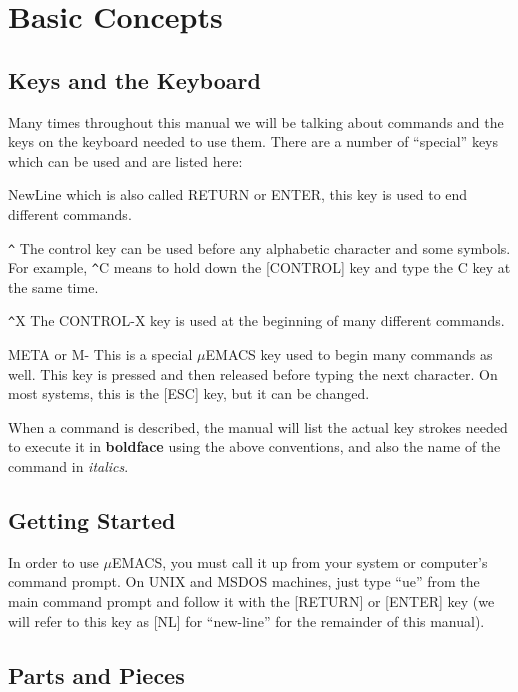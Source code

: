 \chapter{Basic Concepts}
\section{Keys and the Keyboard}

Many times throughout this manual we will be talking about commands and
the keys on the keyboard needed to use them. There are a number of
``special'' keys which can be used and are listed here:

{\sc [NL]} NewLine which is also called RETURN or ENTER, this key is used to
end different commands.

{\sc \verb+^+} The control key can be used before any alphabetic
character and some symbols. For example, \verb+^+C means to hold down the
[CONTROL] key and type the C key at the same time.

{\sc \verb+^+X} The CONTROL-X key is used at the beginning of many different
commands.

{\sc META} or {\sc M-} This is a special $\mu$EMACS key used to begin many
commands as well. This key is pressed and then released before typing
the next character. On most systems, this is the [ESC] key, but it can
be changed.

When a command is described, the manual will list the actual
key strokes needed to execute it in {\bf boldface} using the above
conventions, and also the name of the command in {\it italics}.

\section{Getting Started}

In order to use $\mu$EMACS, you must call it up from your system or
computer's command prompt. On UNIX and MSDOS machines, just type
``ue'' from the main command prompt and follow it with the [RETURN]
or [ENTER] key (we will refer to this key as [NL] for ``new-line'' for
the remainder of this manual). 

\section{Parts and Pieces}

